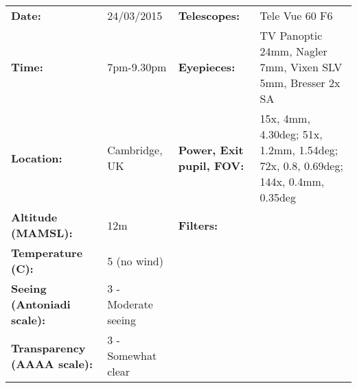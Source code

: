 \begin{tabular}{ p{1.7in} p{1.2in} p{1.5in} p{4.2in}}
{\bf Date:} & 24/03/2015 & {\bf Telescopes:} & Tele Vue 60 F6 \\ 
{\bf Time:} & 7pm-9.30pm & {\bf Eyepieces:} & TV Panoptic 24mm, Nagler 7mm, Vixen SLV 5mm, Bresser 2x SA \\ 
{\bf Location:} & Cambridge, UK & {\bf Power, Exit pupil, FOV:} & 15x, 4mm, 4.30deg; 51x, 1.2mm, 1.54deg; 72x, 0.8, 0.69deg; 144x, 0.4mm, 0.35deg \\ 
{\bf Altitude (MAMSL):} & 12m & {\bf Filters:} &  \\ 
{\bf Temperature (C):} & 5 (no wind) & & \\ 
{\bf Seeing (Antoniadi scale):} & 3 - Moderate seeing & & \\ 
{\bf Transparency (AAAA scale):} & 3 - Somewhat clear & & \\ 
\end{tabular}
\centering 
